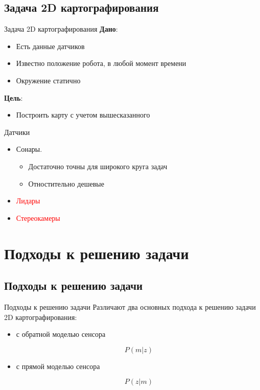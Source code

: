 \documentclass[9pt]{beamer}
\begin{document}
\subsection{Задача 2D картографирования}

\begin{frame}{Задача 2D картографирования}
\textbf{Дано}:
\begin{itemize}

  \item
  {
    Есть данные датчиков
  }
  \item
  {
    Известно положение робота, в любой момент времени
  }
  \item
  {
    Окружение статично
  }
\end{itemize}
\textbf{Цель}:
\begin{itemize}
  \item
  {
    Построить карту с учетом вышесказанного
  }
\end{itemize}
\end{frame}

\begin{frame}{Датчики}

\begin{itemize}
  \item
  {
    Сонары.
    \begin{itemize}
    \item
    {
      Достаточно точны для широкого круга задач
    }
    \item
    {
      Отностительно дешевые
    }
    \end{itemize}
  }
  \item
  {
    \textcolor{red}{Лидары}
  }
  \item
  {
    \textcolor{red}{Стереокамеры}
  }
\end{itemize}

\end{frame}

\section{Подходы к решению задачи}

\subsection{Подходы к решению задачи}

\begin{frame}{Подходы к решению задачи}
Различают два основных подхода к решению задачи 2D картографирования:
\begin{itemize}
  \item
  {
    с обратной моделью сенсора

    $$P(m|z)$$
  }
  \item
  {
    с прямой моделью сенсора

    $$P(z|m)$$
  }
\end{itemize}

\end{frame}
\end{document}
